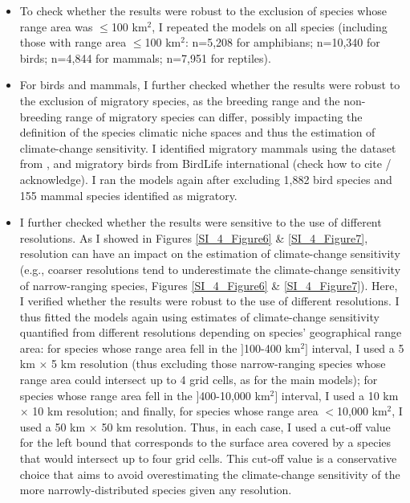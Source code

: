 \begin{itemize}

\item To check whether the results were robust to the exclusion of species whose range area was $\leq$100 km$^2$, I repeated the models on all species (including those with range area $\leq$100 km$^2$: n=5,208 for amphibians; n=10,340 for birds; n=4,844 for mammals; n=7,951 for reptiles). 

\item For birds and mammals, I further checked whether the results were robust to the exclusion of migratory species, as the breeding range and the non-breeding range of migratory species can differ, possibly impacting the definition of the species climatic niche spaces and thus the estimation of climate-change sensitivity. I identified migratory mammals using the dataset from \citet{Gnanadesikan2017}, and migratory birds from BirdLife international (check how to cite / acknowledge). I ran the models again after excluding 1,882 bird species and 155 mammal species identified as migratory.

\item I further checked whether the results were sensitive to the use of different resolutions. As I showed in Figures \ref{SI_4_Figure6} \& \ref{SI_4_Figure7}, resolution can have an impact on the estimation of climate-change sensitivity (e.g., coarser resolutions tend to underestimate the climate-change sensitivity of narrow-ranging species, Figures \ref{SI_4_Figure6} \& \ref{SI_4_Figure7}). Here, I verified whether the results were robust to the use of different resolutions. I thus fitted the models again using estimates of climate-change sensitivity quantified from different resolutions depending on species' geographical range area: for species whose range area fell in the $]$100-400 km$^2]$ interval, I used a 5 km $\times$ 5 km resolution (thus excluding those narrow-ranging species whose range area could intersect up to 4 grid cells, as for the main models); for species whose range area fell in the $]$400-10,000 km$^2]$ interval, I used a 10 km $\times$ 10 km resolution; and finally, for species whose range area $<$10,000 km$^2$, I used a 50 km $\times$ 50 km resolution. Thus, in each case, I used a cut-off value for the left bound that corresponds to the surface area covered by a species that would intersect up to four grid cells. This cut-off value is a conservative choice that aims to avoid overestimating the climate-change sensitivity of the more narrowly-distributed species given any resolution.


\end{itemize}
